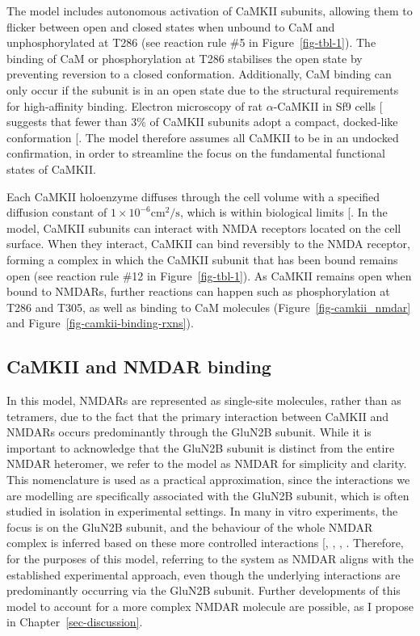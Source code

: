 \documentclass[
  11pt,
  letterpaper,
]{scrreprt}
\begin{document}
The model includes autonomous activation of CaMKII subunits, allowing
them to flicker between open and closed states when unbound to CaM and
unphosphorylated at T286 (see reaction rule \#5 in
Figure~\ref{fig-tbl-1}). The binding of CaM or phosphorylation at T286
stabilises the open state by preventing reversion to a closed
conformation. Additionally, CaM binding can only occur if the subunit is
in an open state due to the structural requirements for high-affinity
binding. Electron microscopy of rat \(\alpha\)-CaMKII in Sf9 cells
{[}\citeproc{ref-myers2017CaMKII}{164}{]} suggests that fewer than 3\%
of CaMKII subunits adopt a compact, docked-like conformation
{[}\citeproc{ref-bayer2019CaM}{450}{]}. The model therefore assumes all
CaMKII to be in an undocked confirmation, in order to streamline the
focus on the fundamental functional states of CaMKII.

Each CaMKII holoenzyme diffuses through the cell volume with a specified
diffusion constant of \(1\times 10^{-6} \text{cm}^2/\text{s}\), which is
within biological limits {[}\citeproc{ref-sanabria2008Spatial}{451}{]}.
In the model, CaMKII subunits can interact with NMDA receptors located
on the cell surface. When they interact, CaMKII can bind reversibly to
the NMDA receptor, forming a complex in which the CaMKII subunit that
has been bound remains open (see reaction rule \#12 in
Figure~\ref{fig-tbl-1}). As CaMKII remains open when bound to NMDARs,
further reactions can happen such as phosphorylation at T286 and T305,
as well as binding to CaM molecules (Figure~\ref{fig-camkii_nmdar} and
Figure~\ref{fig-camkii-binding-rxns}).

\subsection{CaMKII and NMDAR binding}\label{camkii-and-nmdar-binding}

In this model, NMDARs are represented as single-site molecules, rather
than as tetramers, due to the fact that the primary interaction between
CaMKII and NMDARs occurs predominantly through the GluN2B subunit. While
it is important to acknowledge that the GluN2B subunit is distinct from
the entire NMDAR heteromer, we refer to the model as NMDAR for
simplicity and clarity. This nomenclature is used as a practical
approximation, since the interactions we are modelling are specifically
associated with the GluN2B subunit, which is often studied in isolation
in experimental settings. In many in vitro experiments, the focus is on
the GluN2B subunit, and the behaviour of the whole NMDAR complex is
inferred based on these more controlled interactions
{[},
,
,
\citeproc{ref-barcomb2016CaMKIIa}{453}{]}. Therefore, for the purposes
of this model, referring to the system as NMDAR aligns with the
established experimental approach, even though the underlying
interactions are predominantly occurring via the GluN2B subunit. Further
developments of this model to account for a more complex NMDAR molecule
are possible, as I propose in Chapter~\ref{sec-discussion}.
\end{document}
